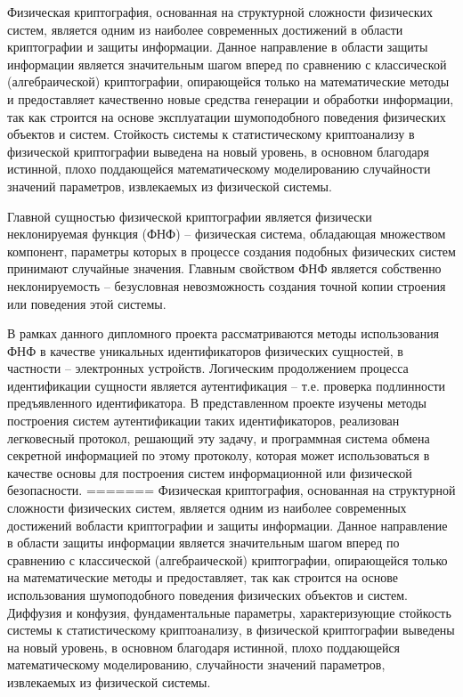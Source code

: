 \label{sec:intro}

Физическая криптография, основанная на структурной сложности физических систем, является одним из наиболее современных достижений в области криптографии и защиты информации. Данное направление в области защиты информации является значительным шагом вперед по сравнению с классической (алгебраической) криптографии, опирающейся только на математические методы и предоставляет качественно новые средства генерации и обработки информации, так как строится на основе эксплуатации шумоподобного поведения физических объектов и систем. Стойкость системы к статистическому криптоанализу в физической криптографии выведена на новый уровень, в основном благодаря истинной, плохо поддающейся математическому моделированию случайности значений параметров, извлекаемых из физической системы.

Главной сущностью физической криптографии является физически неклонируемая функция (ФНФ) -- физическая система, обладающая множеством компонент, параметры которых в процессе создания подобных физических систем принимают случайные значения. Главным свойством ФНФ является собственно неклонируемость -- безусловная невозможность создания точной копии строения или поведения этой системы.

В рамках данного дипломного проекта рассматриваются методы использования ФНФ в качестве уникальных идентификаторов физических сущностей, в частности -- электронных устройств. Логическим продолжением процесса идентификации сущности является аутентификация -- т.е. проверка подлинности предъявленного идентификатора. В представленном проекте изучены методы построения систем аутентификации таких идентификаторов, реализован легковесный протокол, решающий эту задачу, и программная система обмена секретной информацией по этому протоколу, которая может использоваться в качестве основы для построения систем информационной или физической безопасности.
=======
Физическая криптография, основанная на структурной сложности физических систем, является одним из наиболее современных достижений вобласти криптографии и защиты информации. Данное направление в области защиты информации является значительным шагом вперед по сравнению с классической (алгебраической) криптографии, опирающейся только на математические методы и предоставляет, так как строится на основе использования шумоподобного поведения физических объектов и систем. Диффузия и конфузия, фундаментальные параметры,  характеризующие стойкость системы к статистическому криптоанализу, в физической криптографии выведены на новый уровень, в основном благодаря истинной, плохо поддающейся математическому моделированию, случайности значений параметров, извлекаемых из физической системы.

